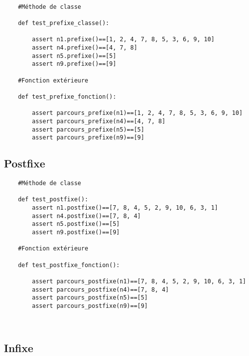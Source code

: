 \documentclass{article}
\begin{document}
\begin{verbatim}

    #Méthode de classe

    def test_prefixe_classe():
        
        assert n1.prefixe()==[1, 2, 4, 7, 8, 5, 3, 6, 9, 10]
        assert n4.prefixe()==[4, 7, 8]
        assert n5.prefixe()==[5]
        assert n9.prefixe()==[9]

    #Fonction extérieure

    def test_prefixe_fonction():
    
        assert parcours_prefixe(n1)==[1, 2, 4, 7, 8, 5, 3, 6, 9, 10]
        assert parcours_prefixe(n4)==[4, 7, 8]
        assert parcours_prefixe(n5)==[5]
        assert parcours_prefixe(n9)==[9]
\end{verbatim}
\newpage
\subsection{Postfixe}

\renewcommand{\theFancyVerbLine}{
  \sffamily\textcolor[rgb]{0.5,0.5,0.5}{\scriptsize\arabic{FancyVerbLine}}}

\begin{verbatim}
    #Méthode de classe

    def test_postfixe():
        assert n1.postfixe()==[7, 8, 4, 5, 2, 9, 10, 6, 3, 1]
        assert n4.postfixe()==[7, 8, 4]
        assert n5.postfixe()==[5]
        assert n9.postfixe()==[9]

    #Fonction extérieure

    def test_postfixe_fonction():
    
        assert parcours_postfixe(n1)==[7, 8, 4, 5, 2, 9, 10, 6, 3, 1]
        assert parcours_postfixe(n4)==[7, 8, 4]
        assert parcours_postfixe(n5)==[5]
        assert parcours_postfixe(n9)==[9]
    


\end{verbatim}

\subsection{Infixe}
\end{document}
